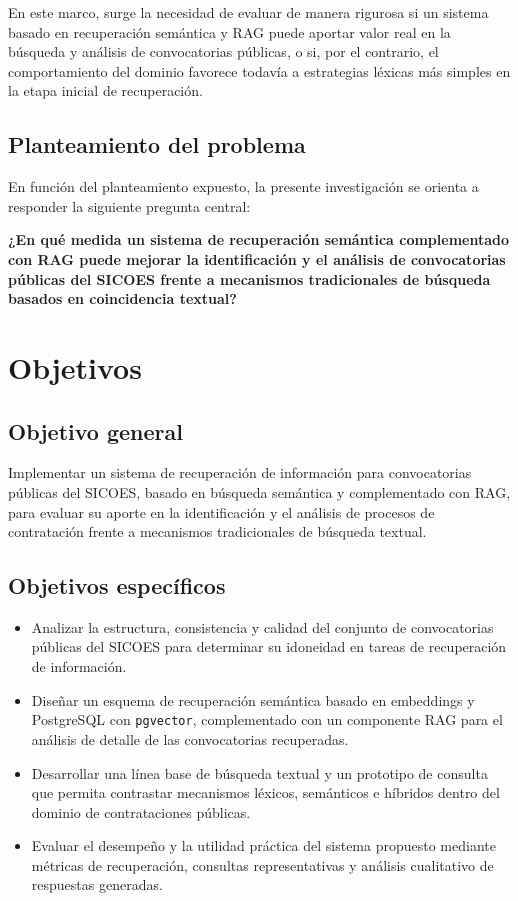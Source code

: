 En este marco, surge la necesidad de evaluar de manera rigurosa si un sistema basado en recuperación semántica y RAG puede aportar valor real en la búsqueda y análisis de convocatorias públicas, o si, por el contrario, el comportamiento del dominio favorece todavía a estrategias léxicas más simples en la etapa inicial de recuperación.

\subsection{Planteamiento del problema}

En función del planteamiento expuesto, la presente investigación se orienta a responder la siguiente pregunta central:

\begin{center}
\textbf{\large ¿En qué medida un sistema de recuperación semántica complementado con RAG puede mejorar la identificación y el análisis de convocatorias públicas del SICOES frente a mecanismos tradicionales de búsqueda basados en coincidencia textual?}
\end{center}

\section{Objetivos}

\subsection{Objetivo general}

Implementar un sistema de recuperación de información para convocatorias públicas del SICOES, basado en búsqueda semántica y complementado con RAG, para evaluar su aporte en la identificación y el análisis de procesos de contratación frente a mecanismos tradicionales de búsqueda textual.

\subsection{Objetivos específicos}

\begin{itemize}
    \item Analizar la estructura, consistencia y calidad del conjunto de convocatorias públicas del SICOES para determinar su idoneidad en tareas de recuperación de información.
    \item Diseñar un esquema de recuperación semántica basado en embeddings y PostgreSQL con \texttt{pgvector}, complementado con un componente RAG para el análisis de detalle de las convocatorias recuperadas.
    \item Desarrollar una línea base de búsqueda textual y un prototipo de consulta que permita contrastar mecanismos léxicos, semánticos e híbridos dentro del dominio de contrataciones públicas.
    \item Evaluar el desempeño y la utilidad práctica del sistema propuesto mediante métricas de recuperación, consultas representativas y análisis cualitativo de respuestas generadas.
\end{itemize}

